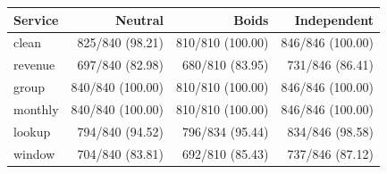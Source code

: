 \begin{tabular}{lrrr}
\toprule
Service & \textcolor{NeutralBlue}{Neutral} & \textcolor{BoidsOrange}{Boids} & \textcolor{IndependentGray}{Independent} \\
\midrule
clean & 825/840 (98.21) & 810/810 (100.00) & 846/846 (100.00) \\
revenue & 697/840 (82.98) & 680/810 (83.95) & 731/846 (86.41) \\
group & 840/840 (100.00) & 810/810 (100.00) & 846/846 (100.00) \\
monthly & 840/840 (100.00) & 810/810 (100.00) & 846/846 (100.00) \\
lookup & 794/840 (94.52) & 796/834 (95.44) & 834/846 (98.58) \\
window & 704/840 (83.81) & 692/810 (85.43) & 737/846 (87.12) \\
\bottomrule
\end{tabular}
